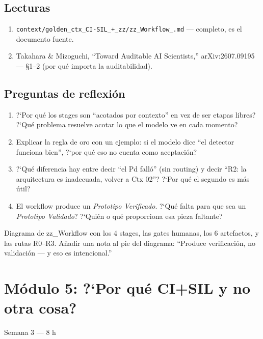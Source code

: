 \documentclass[11pt,a4paper]{article}
\newcommand{\timeest}[1]{\textsf{\footnotesize\color{muted}#1}}
\begin{document}
\subsection{Lecturas}
\begin{enumerate}[label=\textbf{L\arabic*.}]
  \item \texttt{context/golden\_ctx\_CI-SIL\_+\_zz/zz\_Workflow\_.md} --- completo, es el documento fuente.
  \item Takahara \& Mizoguchi, ``Toward Auditable AI Scientists,'' arXiv:2607.09195 --- \S1--2 (por qu\'e importa la auditabilidad).
\end{enumerate}

\subsection{Preguntas de reflexi\'on}
\begin{enumerate}[label=\textbf{R\arabic*.}]
  \item ?`Por qu\'e los stages son ``acotados por contexto'' en vez de ser etapas libres? ?`Qu\'e problema resuelve acotar lo que el modelo ve en cada momento?
  \item Explicar la regla de oro con un ejemplo: si el modelo dice ``el detector funciona bien'', ?`por qu\'e eso no cuenta como aceptaci\'on?
  \item ?`Qu\'e diferencia hay entre decir ``el Pd fall\'o'' (sin routing) y decir ``R2: la arquitectura es inadecuada, volver a Ctx 02''? ?`Por qu\'e el segundo es m\'as \'util?
  \item El workflow produce un \textit{Prototipo Verificado}. ?`Qu\'e falta para que sea un \textit{Prototipo Validado}? ?`Qui\'en o qu\'e proporciona esa pieza faltante?
\end{enumerate}

\begin{deliverbox}[Entregable]
Diagrama de zz\_Workflow con los 4 stages, las gates humanas, los 6 artefactos, y las rutas R0--R3. A\~nadir una nota al pie del diagrama: ``Produce verificaci\'on, no validaci\'on --- y eso es intencional.''
\end{deliverbox}

\section{M\'odulo 5: ?`Por qu\'e CI+SIL y no otra cosa?}
\timeest{Semana 3 --- 8 h}
\end{document}
